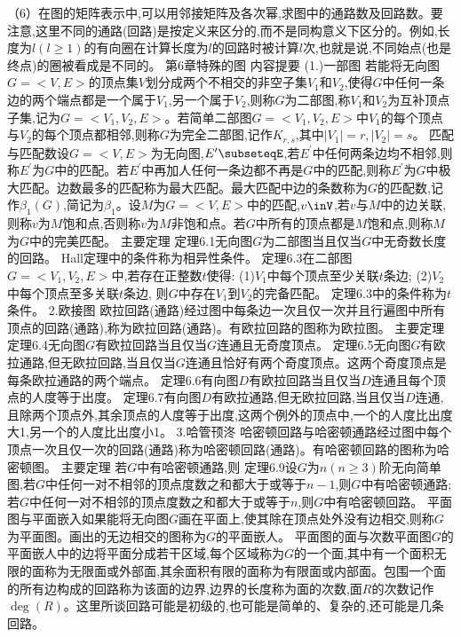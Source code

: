 （6）在图的矩阵表示中,可以用邻接矩阵及各次幂,求图中的通路数及回路数。要注意,这里不同的通路(回路)是按定义来区分的,而不是同构意义下区分的。例如,长度为$l(l\geqslant1)$的有向圈在计算长度为$l$的回路时被计算$l$次,也就是说,不同始点(也是终点)的圈被看成是不同的。
{第6章特殊的图}
{内容提要}
{(1.)一部图}
若能将无向图$G=<V,E>$的顶点集$V$划分成两个不相交的非空子集$V_{1}$和$V_{2}$,使得$G$中任何一条边的两个端点都是一个属于$V_{1}$,另一个属于$V_{2}$,则称$G$为二部图,称$V_{1}$和$V_{2}$为互补顶点子集,记为$G=<V_{1},V_{2},E>$。若简单二部图$G=<V_{1},V_{2},E>$中$V_{1}$的每个顶点与$V_{2}$的每个顶点都相邻,则称$G$为完全二部图,记作$K_{r,s}$,其中$\left|V_{1}\right|=r,\left|V_{2}\right|=s$。
匹配与匹配数设$G=<V,E>$为无向图,$E^{\prime}\subseteqE$,若$E^{\prime}$中任何两条边均不相邻,则称$E^{\prime}$为$G$中的匹配。若$E^{\prime}$中再加人任何一条边都不再是$G$中的匹配,则称$E^{\prime}$为$G$中极大匹配。边数最多的匹配称为最大匹配。最大匹配中边的条数称为$G$的匹配数,记作$\beta_{1}(G)$,简记为$\beta_{1}$。设$M$为$G=<V,E>$中的匹配,$v\inV$,若$v$与$M$中的边关联,则称$v$为$M$饱和点,否则称$v$为$M$非饱和点。若$G$中所有的顶点都是$M$饱和点,则称$M$为$G$中的完美匹配。
{主要定理}
定理6.1无向图$G$为二部图当且仅当$G$中无奇数长度的回路。
Hall定理中的条件称为相异性条件。
定理6.3在二部图$G=<V_{1},V_{2},E>$中,若存在正整数$t$使得:
(1)$V_{1}$中每个顶点至少关联$t$条边;
(2)$V_{2}$中每个顶点至多关联$t$条边,
则$G$中存在$V_{1}$到$V_{2}$的完备匹配。
定理6.3中的条件称为$t$条件。
{2.欧接图}
欧拉回路(通路)经过图中每条边一次且仅一次并且行遍图中所有顶点的回路(通路),称为欧拉回路(通路)。有欧拉回路的图称为欧拉图。
{主要定理}
定理6.4无向图$G$有欧拉回路当且仅当$G$连通且无奇度顶点。
定理6.5无向图$G$有欧拉通路,但无欧拉回路,当且仅当$G$连通且恰好有两个奇度顶点。这两个奇度顶点是每条欧拉通路的两个端点。
定理6.6有向图$D$有欧拉回路当且仅当$D$连通且每个顶点的人度等于出度。
定理6.7有向图$D$有欧拉通路,但无欧拉回路,当且仅当$D$连通,且除两个顶点外,其余顶点的人度等于出度,这两个例外的顶点中,一个的人度比出度大1,另一个的人度比出度小1。
{3.哈管顸泈}
哈密顿回路与哈密顿通路经过图中每个顶点一次且仅一次的回路(通路)称为哈密顿回路(通路)。有哈密顿回路的图称为哈密顿图。
{主要定理}
若$G$中有哈密顿通路,则
定理6.9设$G$为$n(n\geqslant3)$阶无向简单图,若$G$中任何一对不相邻的顶点度数之和都大于或等于$n-1$,则$G$中有哈密顿通路;若$G$中任何一对不相邻的顶点度数之和都大于或等于$n$,则$G$中有哈密顿回路。
平面图与平面嵌入如果能将无向图$G$画在平面上,使其除在顶点处外没有边相交,则称$G$为平面图。画出的无边相交的图称为$G$的平面嵌人。
平面图的面与次数平面图$G$的平面嵌人中的边将平面分成若干区域,每个区域称为$G$的一个面,其中有一个面积无限的面称为无限面或外部面,其余面积有限的面称为有限面或内部面。包围一个面的所有边构成的回路称为该面的边界,边界的长度称为面的次数,面$R$的次数记作$\operatorname{deg}(R)$。这里所谈回路可能是初级的,也可能是简单的、复杂的,还可能是几条回路。
